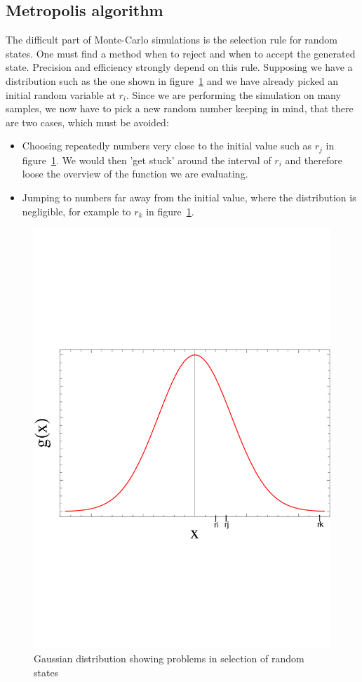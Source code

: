 \subsection{Metropolis algorithm}\label{sec:metropolis}
The difficult part of Monte-Carlo simulations is the selection rule for random states. One must find a method when to reject and when to accept the generated state. Precision and efficiency strongly depend on this rule. Supposing we have a distribution such as the one shown in figure~\ref{fig:distribution} and we have already picked an initial random variable at $r_i$. Since we are performing the simulation on many samples, we now have to pick a new random number keeping in mind, that there are two cases, which must be avoided:
\begin{itemize}
\item Choosing repeatedly numbers very close to the initial value such as $r_j$ in figure~\ref{fig:distribution}. We would then 'get stuck' around the interval of $r_i$ and therefore loose the overview of the function we are evaluating.
\item Jumping to numbers far away from the initial value, where the distribution is negligible, for example to $r_k$ in figure~\ref{fig:distribution}. 
\end{itemize}
\begin{figure}
    \centering
    \includegraphics[scale=0.35]{distribution}
    \caption{Gaussian distribution showing problems in selection of random states}
    \label{fig:distribution}
\end{figure}
